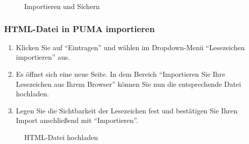 \begin{figure}[h!]
 \centering
 \caption{Importieren und Sichern}
 \label{figure111}
\end{figure}
\subsubsection{HTML-Datei in PUMA importieren}
\begin{enumerate}
    \item Klicken Sie auf \enquote{Eintragen} und wählen im Dropdown-Menü \enquote{Lesezeichen importieren} aus.
    \item Es öffnet sich eine neue Seite. In dem Bereich \enquote{Importieren Sie Ihre Lesezeichen aus Ihrem Browser} können Sie nun die entsprechende Datei hochladen. 
    \item Legen Sie die Sichtbarkeit der Lesezeichen fest und bestätigen Sie Ihren Import anschließend mit \enquote{Importieren}.
\end{enumerate}
\begin{figure}[h!]
 \centering
 \caption{HTML-Datei hochladen}
 \label{figure111}
\end{figure}
